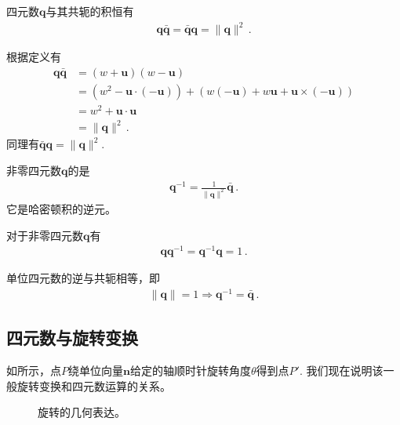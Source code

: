 \begin{proposition}
    四元数${\bm q}$与其共轭的积恒有
    \begin{align}
        {\bm q}\bar{\bm q}=\bar{\bm q}{\bm q}=\|{\bm q}\|^2\, .
    \end{align}
\end{proposition}
\begin{prove}
    根据定义有
    \begin{align}
        {\bm q}\bar{\bm q} & =(w+{\bm u})(w-{\bm u})\nonumber                                                      \\
                           & =(w^2-{\bm u}\cdot(-{\bm u}))+(w(-{\bm u})+w{\bm u}+{\bm u}\times(-{\bm u}))\nonumber \\
                           & =w^2+{\bm u}\cdot{\bm u}\nonumber                                                     \\
                           & =\|{\bm q}\|^2\, .
    \end{align}
    同理有$\bar{\bm q}{\bm q}=\|{\bm q}\|^2$.
\end{prove}
\begin{definition}
    非零四元数${\bm q}$的是
    \begin{align}
        {\bm q}^{-1}=\frac{1}{\|{\bm q}\|^2}\bar{\bm q}\, .
    \end{align}
    它是哈密顿积的逆元。
\end{definition}
\begin{corollary}
    对于非零四元数${\bm q}$有
    \begin{align}
        {\bm q}{\bm q}^{-1}={\bm q}^{-1}{\bm q}=1\, .
    \end{align}
\end{corollary}
\begin{corollary}
    单位四元数的逆与共轭相等，即
    \begin{align}
        \|{\bm q}\|=1 \Rightarrow {\bm q}^{-1}=\bar{\bm q}\, .
    \end{align}
\end{corollary}

\subsection{四元数与旋转变换}\label{sub:四元数与旋转变换}
如所示，点$P$绕单位向量$\bm n$给定的轴顺时针旋转角度$\theta$得到点$P'$.
我们现在说明该一般旋转变换和四元数运算的关系。
\begin{figure}[htbp]
    \centering
    \caption{旋转的几何表达。}
    \label{fig:2.ex1}
\end{figure}

